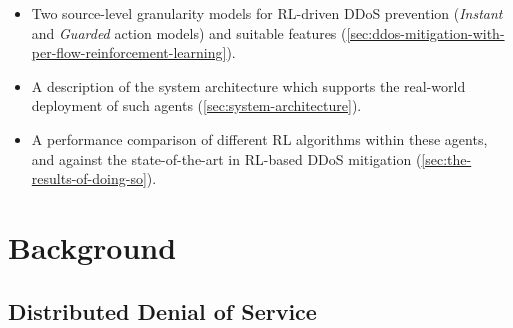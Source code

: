 \documentclass[10pt, times, conference, letterpaper]{IEEEtran}
\begin{document}
\begin{itemize}
	\item Two source-level granularity models for RL-driven DDoS prevention (\emph{Instant} and \emph{Guarded} action models) and suitable features (\cref{sec:ddos-mitigation-with-per-flow-reinforcement-learning}).
	\item A description of the system architecture which supports the real-world deployment of such agents (\cref{sec:system-architecture}).
	\item A performance comparison of different RL algorithms within these agents, and against the state-of-the-art in RL-based DDoS mitigation (\cref{sec:the-results-of-doing-so}).
\end{itemize}

\section{Background}

\subsection{Distributed Denial of Service}
\end{document}
